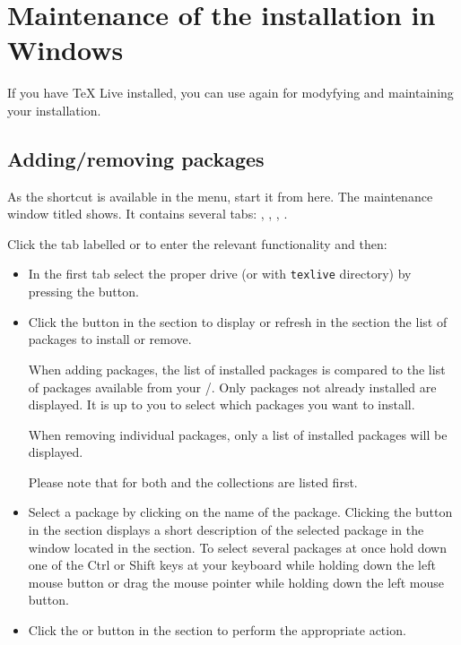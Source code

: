 \documentclass{article}
\begin{document}
\section{Maintenance of the installation in Windows}

If you have TeX Live installed, you can use  again
for modyfying and maintaining your installation.

\subsection{Adding/removing packages}

As the  shortcut is available in the  menu, start it from here. The maintenance window
titled  shows. It
contains several tabs: , , 
, .

Click the tab labelled  or  
to enter the relevant functionality and then:

\begin{itemize}
\item In the first tab select the proper \CD{} drive (or \DVD with
  \texttt{texlive} directory) by pressing the  button.
\item Click the  button in the  section to 
display or refresh in the  section the 
list of packages to install or remove.

When adding packages, the list of installed packages is compared to the list
of packages available from your \CD/\DVD. Only packages not already installed are
displayed. It is up to you to select which packages you want to
install. 

When removing individual packages, only a list of installed packages
will be displayed.

Please note that for both  and 
the collections are listed first.

\item Select a package by clicking on the name of the package. Clicking the
 button in the  section displays a short
description of the selected package in the window located in the  section. To select several packages at once hold
down one of the Ctrl or Shift keys at your keyboard while holding down the
left mouse button or drag the mouse pointer while holding down the left mouse
button.

\item Click the  or  button in the
 section to perform the appropriate action.
\end{itemize}
\end{document}
